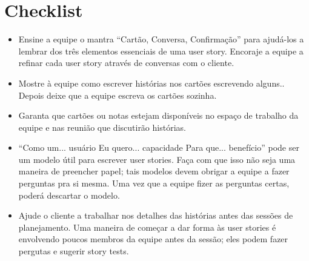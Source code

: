 \documentclass[a4paper, 10pt, font=plain]{abnt}
\begin{document}
\section{Checklist}

\begin{itemize}
\item Ensine a equipe o mantra ``Cartão, Conversa, Confirmação'' para ajudá-los a lembrar dos três elementos essenciais de uma user story. Encoraje a equipe a refinar cada user story através de conversas com o cliente.

\item Mostre à equipe como escrever histórias nos cartões escrevendo alguns.. Depois deixe que a equipe escreva os cartões sozinha.

\item Garanta que cartões ou notas estejam disponíveis no espaço de trabalho da equipe e nas reunião que discutirão histórias.

\item ``Como um... usuário Eu quero... capacidade Para que... benefício'' pode ser um modelo útil para escrever user stories. Faça com que isso não seja uma maneira de preencher papel; tais modelos devem obrigar a equipe a fazer perguntas pra si mesma. Uma vez que a equipe fizer as perguntas certas, poderá descartar o modelo.

\item Ajude o cliente a trabalhar nos detalhes das histórias antes das sessões de planejamento. Uma maneira de começar a dar forma às user stories é envolvendo poucos membros da equipe antes da sessão; eles podem fazer pergutas e sugerir story tests.

\end{itemize}
\end{document}
